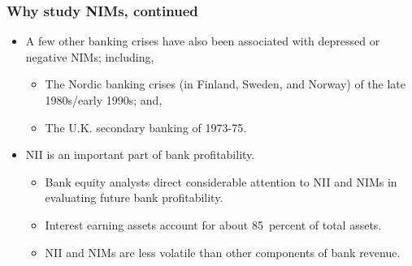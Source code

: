 \documentclass[handout]{beamer}
\begin{document}
\begin{frame}
\frametitle{Why study NIMs, continued}
\begin{itemize}
\item \vspace{0.0in} A few other banking crises have also been associated with depressed or negative NIMs; including,
\begin{itemize}
\item \vspace{0.075in} The Nordic banking crises (in Finland, Sweden, and Norway) of the late 1980s/early 1990s; and,
\item \vspace{0.075in} The U.K. secondary banking of 1973-75.
\end{itemize}
\item \vspace{0.25in} NII is an important part of bank profitability.
\begin{itemize}
\item \vspace{0.075in} Bank equity analysts direct considerable attention to NII and NIMs in evaluating future bank profitability.
\item \vspace{0.075in} Interest earning assets account for about 85~percent of total assets.
\item \vspace{0.075in} NII and NIMs are less volatile than other components of bank revenue.
\end{itemize}
\end{itemize}
\end{frame}
\end{document}
